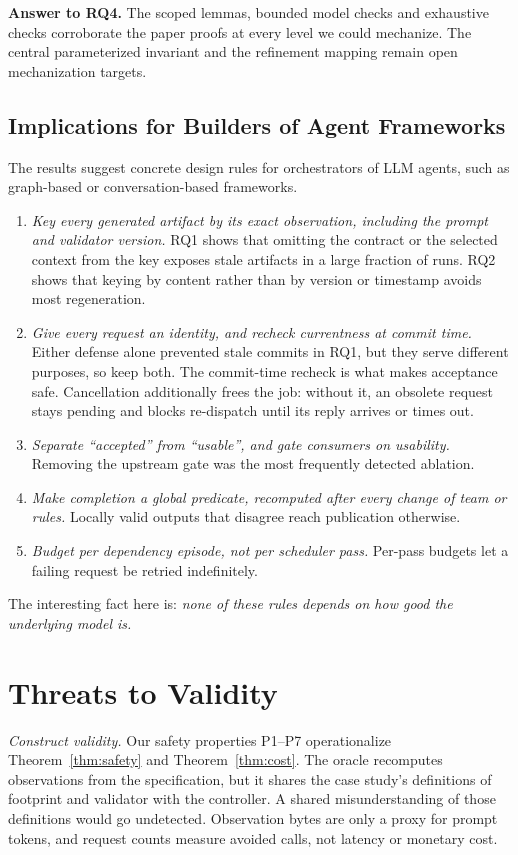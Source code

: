 \documentclass[10pt,journal,compsoc]{IEEEtran}
\theoremstyle{plain}
\theoremstyle{definition}
\begin{document}
\textbf{Answer to RQ4.} The scoped lemmas, bounded model checks and exhaustive checks corroborate the paper proofs at every level we could mechanize. The central parameterized invariant and the refinement mapping remain open mechanization targets.

\subsection{Implications for Builders of Agent Frameworks}\label{sec:implications}
The results suggest concrete design rules for orchestrators of LLM agents, such as graph-based or conversation-based frameworks.
\begin{enumerate}
\item \emph{Key every generated artifact by its exact observation, including the prompt and validator version.} RQ1 shows that omitting the contract or the selected context from the key exposes stale artifacts in a large fraction of runs. RQ2 shows that keying by content rather than by version or timestamp avoids most regeneration.
\item \emph{Give every request an identity, and recheck currentness at commit time.} Either defense alone prevented stale commits in RQ1, but they serve different purposes, so keep both. The commit-time recheck is what makes acceptance safe. Cancellation additionally frees the job: without it, an obsolete request stays pending and blocks re-dispatch until its reply arrives or times out.
\item \emph{Separate ``accepted'' from ``usable'', and gate consumers on usability.} Removing the upstream gate was the most frequently detected ablation.
\item \emph{Make completion a global predicate, recomputed after every change of team or rules.} Locally valid outputs that disagree reach publication otherwise.
\item \emph{Budget per dependency episode, not per scheduler pass.} Per-pass budgets let a failing request be retried indefinitely.
\end{enumerate}
The interesting fact here is: \textit{none of these rules depends on how good the underlying model is.}

\section{Threats to Validity}\label{sec:threats}
\emph{Construct validity.} Our safety properties P1--P7 operationalize Theorem~\ref{thm:safety} and Theorem~\ref{thm:cost}. The oracle recomputes observations from the specification, but it shares the case study's definitions of footprint and validator with the controller. A shared misunderstanding of those definitions would go undetected. Observation bytes are only a proxy for prompt tokens, and request counts measure avoided calls, not latency or monetary cost.
\end{document}
